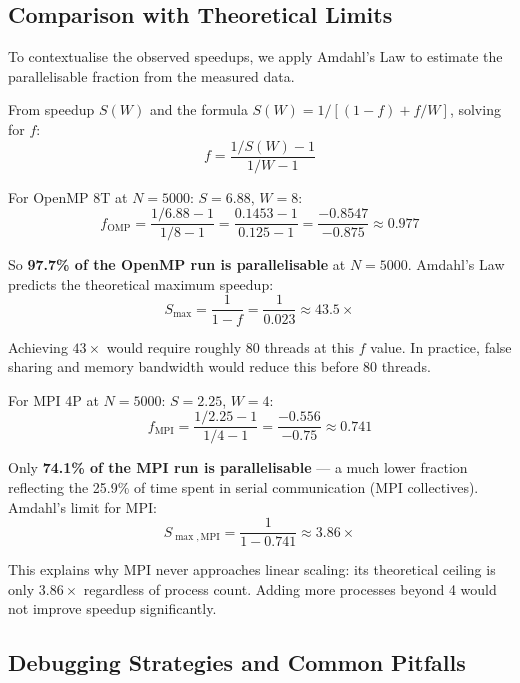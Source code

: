 ﻿\documentclass[12pt,a4paper]{article}
\begin{document}
\subsection{Comparison with Theoretical Limits}

To contextualise the observed speedups, we apply Amdahl's Law to estimate
the parallelisable fraction from the measured data.

From speedup $S(W)$ and the formula $S(W) = 1 / [(1-f) + f/W]$, solving for $f$:
\begin{equation}
    f = \frac{1/S(W) - 1}{1/W - 1}
\end{equation}

For OpenMP 8T at $N=5000$: $S=6.88$, $W=8$:
\begin{equation}
    f_{\text{OMP}} = \frac{1/6.88 - 1}{1/8 - 1}
    = \frac{0.1453 - 1}{0.125 - 1}
    = \frac{-0.8547}{-0.875}
    \approx 0.977
\end{equation}

So \textbf{97.7\% of the OpenMP run is parallelisable} at $N=5000$.
Amdahl's Law predicts the theoretical maximum speedup:
\begin{equation}
    S_{\max} = \frac{1}{1 - f} = \frac{1}{0.023} \approx 43.5\times
\end{equation}

Achieving $43\times$ would require roughly 80 threads at this $f$ value.
In practice, false sharing and memory bandwidth would reduce this before
80 threads.

For MPI 4P at $N=5000$: $S=2.25$, $W=4$:
\begin{equation}
    f_{\text{MPI}} = \frac{1/2.25 - 1}{1/4 - 1}
    = \frac{-0.556}{-0.75}
    \approx 0.741
\end{equation}

Only \textbf{74.1\% of the MPI run is parallelisable} --- a much lower
fraction reflecting the 25.9\% of time spent in serial communication
(MPI collectives). Amdahl's limit for MPI:
\begin{equation}
    S_{\max,\text{MPI}} = \frac{1}{1 - 0.741} \approx 3.86\times
\end{equation}

This explains why MPI never approaches linear scaling: its theoretical
ceiling is only $3.86\times$ regardless of process count. Adding more
processes beyond 4 would not improve speedup significantly.

\subsection{Debugging Strategies and Common Pitfalls}
\end{document}

